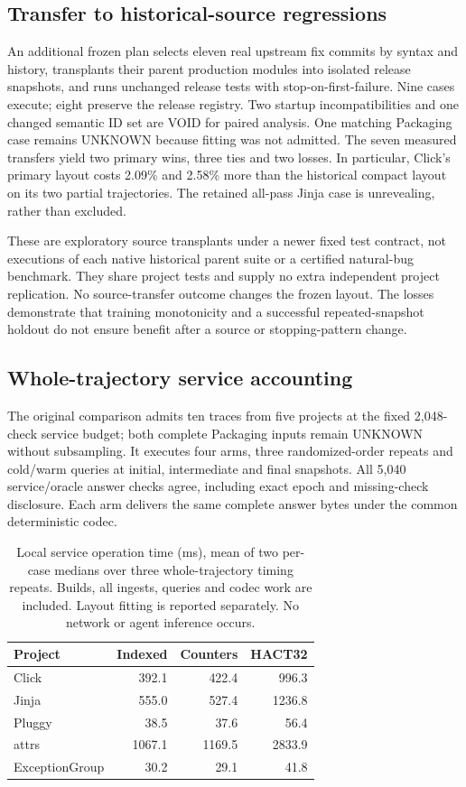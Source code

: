\documentclass[10pt,journal,compsoc]{IEEEtran}
\theoremstyle{definition}\newtheorem{definition}[theorem]{Definition}
\begin{document}
\subsection{Transfer to historical-source regressions}
An additional frozen plan selects eleven real upstream fix commits by
syntax and history, transplants their parent production modules into
isolated release snapshots, and runs unchanged release tests with
stop-on-first-failure. Nine cases execute; eight preserve the release
registry. Two startup incompatibilities and one changed semantic ID set
are VOID for paired analysis. One matching Packaging case remains UNKNOWN
because fitting was not admitted. The seven measured transfers yield
two primary wins, three ties and two losses. In particular, Click's
primary layout costs 2.09\% and 2.58\% more than the historical compact layout
on its two partial trajectories. The retained all-pass Jinja case is
unrevealing, rather than excluded.

These are exploratory source transplants under a newer fixed test contract,
not executions of each native historical parent suite or a certified
natural-bug benchmark. They share project tests and supply no extra
independent project replication. No source-transfer outcome changes the
frozen layout. The losses demonstrate that training monotonicity and a
successful repeated-snapshot holdout do not ensure benefit after a source
or stopping-pattern change.

\subsection{Whole-trajectory service accounting}
The original comparison admits ten traces from five projects at the fixed 2,048-check
service budget; both complete Packaging inputs remain UNKNOWN without
subsampling. It executes four arms, three randomized-order repeats and
cold/warm queries at initial, intermediate and final snapshots.
All 5,040 service/oracle answer checks agree,
including exact epoch and missing-check disclosure. Each arm delivers the
same complete answer bytes under the common deterministic codec.

\begin{table}[t]\centering\footnotesize
\caption{Local service operation time (ms), mean of two per-case medians over
three whole-trajectory timing repeats. Builds, all ingests, queries and
codec work are included. Layout fitting is reported separately.
No network or agent inference occurs.}\label{tab:v11-time}
\begin{tabular}{@{}lrrr@{}}\toprule
Project & Indexed & Counters & HACT32\\\midrule
Click & 392.1 & 422.4 & 996.3 \\
Jinja & 555.0 & 527.4 & 1236.8 \\
Pluggy & 38.5 & 37.6 & 56.4 \\
attrs & 1067.1 & 1169.5 & 2833.9 \\
ExceptionGroup & 30.2 & 29.1 & 41.8 \\
\bottomrule\end{tabular}
\end{table}
\end{document}
